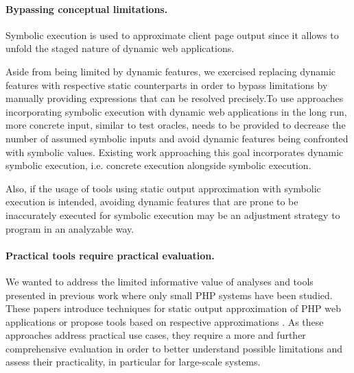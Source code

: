 \documentclass[sigconf, preprint]{acmart}
\begin{document}
\paragraph{Bypassing conceptual limitations.}
Symbolic execution is used to approximate client page output since it allows to
unfold the staged nature of dynamic web applications. 

Aside from being limited by dynamic features, we exercised replacing dynamic
features with respective static counterparts in order to bypass limitations by
manually providing expressions that can be resolved precisely.To use
approaches incorporating symbolic execution with dynamic web applications in
the long run, more concrete input, similar to test oracles, needs
to be provided to decrease the number of assumed symbolic inputs and avoid
dynamic features being confronted with symbolic values. Existing work approaching
this goal \cite{artzi_finding_2008,artzi_finding_2010,DynamicWassermann}
incorporates dynamic symbolic execution, i.e. concrete execution alongside symbolic execution.

Also, if the usage of tools using static output approximation with symbolic
execution is intended, avoiding dynamic features that are prone to be inaccurately executed for
symbolic execution  may be an adjustment strategy to program in an analyzable
way. 

\paragraph{Practical tools require practical evaluation.}
We wanted to address the limited informative value of analyses and tools
presented in previous work
\cite{Nguyen:2011:AFH:2190078.2190142,Nguyen:2014:BCG:2635868.2635928,Nguyen:2015:CPS:2786805.2786872,Nguyen:2015:VIS:2819009.2819140,minamide_static_2005,wassermann2007sound}
where only small PHP systems have been studied. These papers introduce
techniques for static output approximation of PHP web applications
\cite{minamide_static_2005,Nguyen:2014:BCG:2635868.2635928,wang_automating_2012} or propose tools
based on respective approximations
\cite{Nguyen:2011:AFH:2190078.2190142,Nguyen:2014:BCG:2635868.2635928,Nguyen:2015:CPS:2786805.2786872,Nguyen:2015:VIS:2819009.2819140,wassermann2007sound,wassermann_static_2008}.
As these approaches address practical use cases, they require a more and further comprehensive evaluation in order to  better understand possible limitations and assess their practicality, in particular for large-scale systems.
\end{document}
